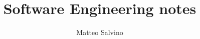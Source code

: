 \documentclass[11pt]{article}
\title{Software Engineering notes}
\author{Matteo Salvino}
\date{}
\begin{document}
\maketitle
\pagebreak
\tableofcontents
\pagebreak









\begin{appendix}
    
    
\end{appendix}
\end{document}

